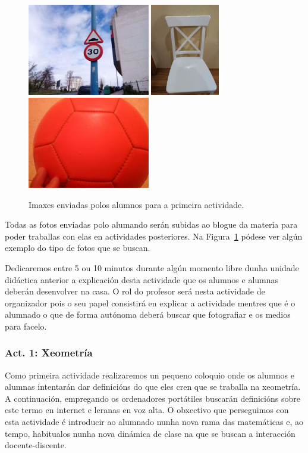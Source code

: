 \begin{figure}[h!]
  \centering
  \includegraphics[height=4cm]{img/act0-1.jpg}
  \includegraphics[height=4cm]{img/act0-2.jpg}
  \includegraphics[height=4cm]{img/act0-3.jpg}
  \caption{Imaxes enviadas polos alumnos para a primeira actividade.}\label{fig:act0}
\end{figure}

Todas as fotos enviadas polo alumando serán subidas ao blogue da materia para poder traballas con elas en actividades posteriores. Na Figura~\ref{fig:act0} pódese ver algún exemplo do tipo de fotos que se buscan.

Dedicaremos entre 5 ou 10 minutos durante algún momento libre dunha unidade didáctica anterior a explicación desta actividade que os alumnos e alumnas deberán desenvolver na casa. O rol do profesor será nesta actividade de organizador pois o seu papel consistirá en explicar a actividade mentres que é o alumnado o que de forma autónoma deberá buscar que fotografiar e os medios para facelo.

\subsubsection{Act. 1: Xeometría}\label{act:xeometria}
Como primeira actividade realizaremos un pequeno coloquio onde os alumnos e alumnas intentarán dar definicións do que eles cren que se traballa na xeometría. A continuación, empregando os ordenadores portátiles buscarán definicións sobre este termo en internet e leranas en voz alta. O obxectivo que perseguimos con esta actividade é introducir ao alumnado nunha nova rama das matemáticas e, ao tempo, habitualos nunha nova dinámica de clase na que se buscan a interacción docente-discente.

